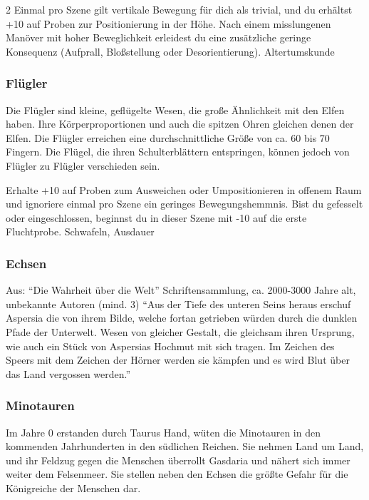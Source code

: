 {\begin{multicols*}{2}
        \abstammungspielwertebox
        {Einmal pro Szene gilt vertikale Bewegung für dich als trivial, und du erhältst +10 auf Proben zur Positionierung in der Höhe.}
        {Nach einem misslungenen Manöver mit hoher Beweglichkeit erleidest du eine zusätzliche geringe Konsequenz (Aufprall, Bloßstellung oder Desorientierung).}
        {Altertumskunde}

        \subsubsection*{Flügler}
        Die Flügler sind kleine, geflügelte Wesen, die große Ähnlichkeit mit den Elfen haben. Ihre Körperproportionen und auch die spitzen Ohren gleichen denen der Elfen. Die Flügler erreichen eine durchschnittliche Größe von ca. 60 bis 70 Fingern. Die Flügel, die ihren Schulterblättern entspringen, können jedoch von Flügler zu Flügler verschieden sein.

        \abstammungspielwertebox
        {Erhalte +10 auf Proben zum Ausweichen oder Umpositionieren in offenem Raum und ignoriere einmal pro Szene ein geringes Bewegungshemmnis.}
        {Bist du gefesselt oder eingeschlossen, beginnst du in dieser Szene mit -10 auf die erste Fluchtprobe.}
        {Schwafeln, Ausdauer}

        \subsubsection*{Echsen}
        Aus: ``Die Wahrheit über die Welt'' Schriftensammlung, ca. 2000-3000 Jahre alt, unbekannte Autoren (mind. 3) ``Aus der Tiefe des unteren Seins heraus erschuf Aspersia die von ihrem Bilde, welche fortan getrieben würden durch die dunklen Pfade der Unterwelt. Wesen von gleicher Gestalt, die gleichsam ihren Ursprung, wie auch ein Stück von Aspersias Hochmut mit sich tragen. Im Zeichen des Speers mit dem Zeichen der Hörner werden sie kämpfen und es wird Blut über das Land vergossen werden.''

        \subsubsection*{Minotauren}
        Im Jahre 0 erstanden durch Taurus Hand, wüten die Minotauren in den kommenden Jahrhunderten in den südlichen Reichen. Sie nehmen Land um Land, und ihr Feldzug gegen die Menschen überrollt Gasdaria und nähert sich immer weiter dem Felsenmeer. Sie stellen neben den Echsen die größte Gefahr für die Königreiche der Menschen dar.

    \end{multicols*}
}


